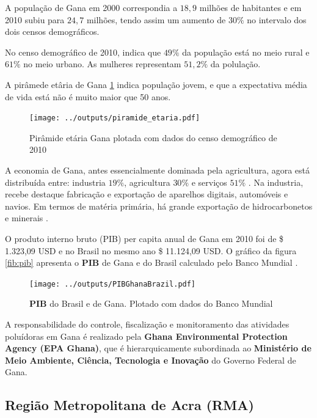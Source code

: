 A população de Gana em 2000 correspondia a $18,9$ milhões 
de habitantes e em 2010 subiu para $24,7$ milhões, tendo assim
um aumento de $30\%$ no intervalo dos dois censos demográficos.

No censo demográfico de 2010, indica que $49\%$ da população está 
no meio rural e $61\%$ no meio urbano. As mulheres representam 
$51,2\%$ da polulação.

A pirâmede etâria de Gana \ref{fig:piramedegana} indica população jovem, 
e que a expectativa média de vida está não é muito maior que 50 anos. 

\begin{figure}[H]
\begin{center}
  \texttt{[image: ../outputs/piramide\_etaria.pdf]}
  \caption{Pirâmide etária Gana plotada com dados do censo 
           demográfico de 2010 \citep{ghanacensus2013} \label{fig:piramedegana}}
\end{center}
\end{figure}

A economia de Gana, antes essencialmente dominada pela agricultura, 
agora está distribuída entre: industria $19\%$, agricultura $30\%$ 
e serviços $51\%$ \citep{ghanacensus2013}.
Na industria, recebe destaque fabricação e exportação de aparelhos digitais, 
automóveis e navios. Em termos de matéria primária, há grande exportação de 
hidrocarbonetos e minerais \citep{ghanacensus2013}.

O produto interno bruto (PIB) per capita anual de Gana em 2010 foi
de \$ 1.323,09 USD e no Brasil no mesmo ano \$ 11.124,09 USD.
O gráfico da figura \ref{fib:pib} apresenta o \textbf{PIB} de Gana e do Brasil 
calculado pelo Banco Mundial \citep{bancomundial}.

\begin{figure}[H]
\begin{center}
  \texttt{[image: ../outputs/PIBGhanaBrazil.pdf]}
  \caption{\textbf{PIB} do Brasil e de Gana. Plotado com dados do 
           Banco Mundial \citep{bancomundial} \label{fig:pib}}
\end{center}
\end{figure}

A responsabilidade do controle, fiscalização e monitoramento das 
atividades poluídoras em Gana é realizado pela 
\textbf{Ghana Environmental Protection Agency (EPA Ghana)}, que é 
hierarquicamente subordinada ao 
\textbf{Ministério de Meio Ambiente, Ciência, Tecnologia e Inovação} do 
Governo Federal de Gana.

\subsection{Região Metropolitana de Acra \textbf{(RMA)}}

